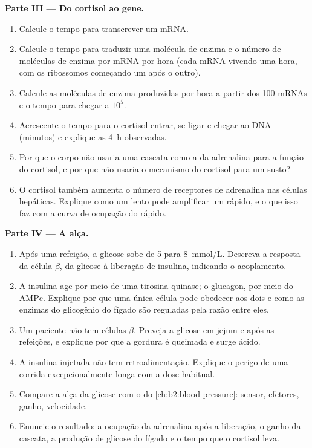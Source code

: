 \begin{problem}
\medskip
\noindent\textbf{Parte III --- Do cortisol ao gene.}
\begin{enumerate}[resume]
  \item Calcule o tempo para transcrever um mRNA.
  \item Calcule o tempo para traduzir uma molécula de enzima e o número
        de moléculas de enzima por mRNA por hora (cada mRNA vivendo uma
        hora, com os ribossomos começando um após o outro).
  \item Calcule as moléculas de enzima produzidas por hora a partir dos
        \num{100} mRNAs e o tempo para chegar a $10^{5}$.
  \item Acrescente o tempo para o cortisol entrar, se ligar e chegar ao
        DNA (minutos) e explique as \qty{4}{h} observadas.
  \item Por que o corpo não usaria uma cascata como a da adrenalina para
        a função do cortisol, e por que não usaria o mecanismo do cortisol
        para um susto?
  \item O cortisol também aumenta o número de receptores de adrenalina
        nas células hepáticas. Explique como um  lento pode
        amplificar um rápido, e o que isso faz com a curva de ocupação do
         rápido.
\end{enumerate}

\medskip
\noindent\textbf{Parte IV --- A alça.}
\begin{enumerate}[resume]
  \item Após uma refeição, a glicose sobe de 5 para \qty{8}{mmol/L}.
        Descreva a resposta da célula $\beta$, da glicose à liberação de
        insulina, indicando o acoplamento.
  \item A insulina age por meio de uma tirosina quinase; o glucagon, por
        meio do AMPc. Explique por que uma única célula pode obedecer aos
        dois e como as enzimas do glicogênio do fígado são reguladas pela
        razão entre eles.
  \item Um paciente não tem células $\beta$. Preveja a glicose em jejum
        e após as refeições, e explique por que a gordura é queimada e
        surge ácido.
  \item A insulina injetada não tem retroalimentação. Explique o perigo
        de uma corrida excepcionalmente longa com a dose habitual.
  \item Compare a alça da glicose com o  do \cref{ch:b2:blood-pressure}:
        sensor, efetores, ganho, velocidade.
  \item Enuncie o resultado: a ocupação da adrenalina após a liberação,
        o ganho da cascata, a produção de glicose do fígado e o tempo que
        o cortisol leva.
\end{enumerate}
\end{problem}
